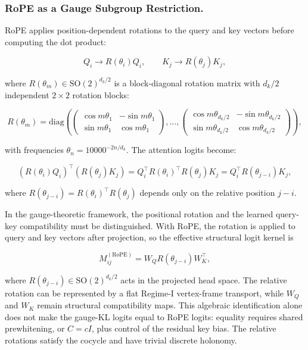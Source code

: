 \documentclass[twoside,11pt]{article}
\begin{document}
\subsubsection{RoPE as a Gauge Subgroup Restriction.}

RoPE applies position-dependent rotations to the query and key vectors before computing the dot product:

\begin{equation}
Q_i \to R(\theta_i) Q_i, \qquad K_j \to R(\theta_j) K_j,
\end{equation}

where $R(\theta_m) \in \mathrm{SO}(2)^{d_k/2}$ is a block-diagonal rotation matrix with $d_k/2$ independent $2\times 2$ rotation blocks:

\begin{equation}
R(\theta_m) = \mathrm{diag} \left(
\begin{pmatrix} \cos m\theta_1 & -\sin m\theta_1 \\ \sin m\theta_1 & \cos m\theta_1 \end{pmatrix},
 \ldots ,
\begin{pmatrix} \cos m\theta_{d_k/2} & -\sin m\theta_{d_k/2} \\ \sin m\theta_{d_k/2} & \cos m\theta_{d_k/2} \end{pmatrix}
\right),
\label{eq:rope_rotation}
\end{equation}

with frequencies $\theta_n = 10000^{-2n/d_k}$. The attention logits become:

\begin{equation}
(R(\theta_i) Q_i)^\top (R(\theta_j) K_j) = Q_i^\top R(\theta_i)^\top R(\theta_j) K_j = Q_i^\top R(\theta_{j-i}) K_j,
\label{eq:rope_relative}
\end{equation}

where $R(\theta_{j-i}) = R(\theta_i)^\top R(\theta_j)$ depends only on the relative position $j - i$.

In the gauge-theoretic framework, the positional rotation and the learned query-key compatibility must be distinguished. With RoPE, the rotation is applied to query and key vectors after projection, so the effective structural logit kernel is

\begin{equation}
M_{ij}^{(\mathrm{RoPE})} = W_QR(\theta_{j-i})W_K^\top,
\label{eq:rope_gauge}
\end{equation}

where $R(\theta_{j-i})\in\mathrm{SO}(2)^{d_k/2}$ acts in the projected head space. The relative rotation can be represented by a flat Regime-I vertex-frame transport, while $W_Q$ and $W_K$ remain structural compatibility maps. This algebraic identification alone does not make the gauge-KL logits equal to RoPE logits: equality requires shared prewhitening, or $C=cI$, plus control of the residual key bias. The relative rotations satisfy the cocycle and have trivial discrete holonomy.
\end{document}

